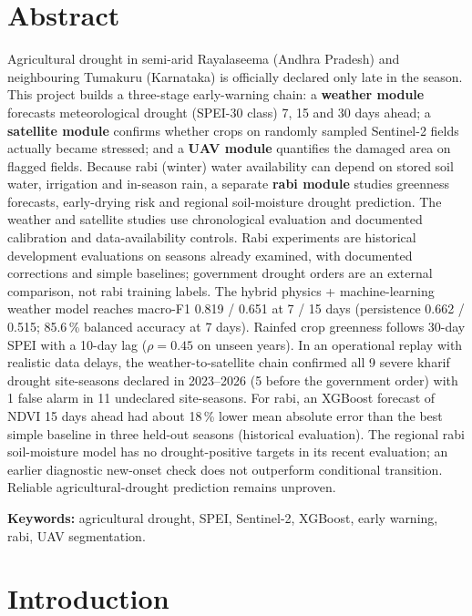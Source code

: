 \documentclass[11pt,a4paper,oneside]{article}
\newcommand{\mf}{macro-F1}
\begin{document}
\section*{Abstract}
Agricultural drought in semi-arid Rayalaseema (Andhra Pradesh) and neighbouring Tumakuru (Karnataka) is officially declared only late in the season. This project builds a three-stage early-warning chain: a \textbf{weather module} forecasts meteorological drought (SPEI-30 class) 7, 15 and 30 days ahead; a \textbf{satellite module} confirms whether crops on randomly sampled Sentinel-2 fields actually became stressed; and a \textbf{UAV module} quantifies the damaged area on flagged fields. Because rabi (winter) water availability can depend on stored soil water, irrigation and in-season rain, a separate \textbf{rabi module} studies greenness forecasts, early-drying risk and regional soil-moisture drought prediction.
The weather and satellite studies use chronological evaluation and documented calibration and data-availability controls. Rabi experiments are historical development evaluations on seasons already examined, with documented corrections and simple baselines; government drought orders are an external comparison, not rabi training labels.
The hybrid physics + machine-learning weather model reaches \mf{} 0.819 / 0.651 at 7 / 15 days (persistence 0.662 / 0.515; 85.6\,\% balanced accuracy at 7 days). Rainfed crop greenness follows 30-day SPEI with a 10-day lag ($\rho = 0.45$ on unseen years). In an operational replay with realistic data delays, the weather-to-satellite chain confirmed all 9 severe kharif drought site-seasons declared in 2023--2026 (5 before the government order) with 1 false alarm in 11 undeclared site-seasons. For rabi, an XGBoost forecast of NDVI 15 days ahead had about 18\,\% lower mean absolute error than the best simple baseline in three held-out seasons (historical evaluation). The regional rabi soil-moisture model has no drought-positive targets in its recent evaluation; an earlier diagnostic new-onset check does not outperform conditional transition. Reliable agricultural-drought prediction remains unproven.

\vspace{4pt}
\textbf{Keywords:} agricultural drought, SPEI, Sentinel-2, XGBoost, early warning, rabi, UAV segmentation.

\section{Introduction}
\end{document}
